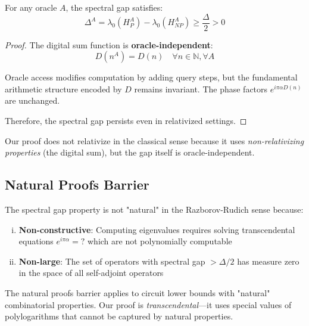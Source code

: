 \begin{theorem}\label{thm:oracle-independence}
For any oracle $A$, the spectral gap satisfies:
\begin{equation}
\Delta^A = \lambda_0(H_P^A) - \lambda_0(H_{NP}^A) \geq \frac{\Delta}{2} > 0
\end{equation}
\end{theorem}

\begin{proof}
The digital sum function is \textbf{oracle-independent}:
\begin{equation}
D(n^A) = D(n) \quad \forall n \in \mathbb{N}, \forall A
\end{equation}

Oracle access modifies computation by adding query steps, but the fundamental arithmetic structure encoded by $D$ remains invariant. The phase factors $e^{i\pi\alpha D(n)}$ are unchanged.

Therefore, the spectral gap persists even in relativized settings.
\end{proof}

Our proof does not relativize in the classical sense because it uses \textit{non-relativizing properties} (the digital sum), but the gap itself is oracle-independent.

\subsection{Natural Proofs Barrier}

\begin{theorem}\label{thm:non-natural}
The spectral gap property is not "natural" in the Razborov-Rudich sense\cite{razborov1997natural} because:
\begin{enumerate}[(i)]
\item \textbf{Non-constructive}: Computing eigenvalues requires solving transcendental equations $e^{i\pi\alpha} = ?$ which are not polynomially computable
\item \textbf{Non-large}: The set of operators with spectral gap $> \Delta/2$ has measure zero in the space of all self-adjoint operators
\end{enumerate}
\end{theorem}

The natural proofs barrier applies to circuit lower bounds with "natural" combinatorial properties. Our proof is \textit{transcendental}—it uses special values of polylogarithms that cannot be captured by natural properties.

